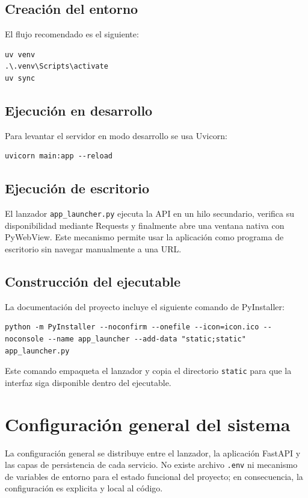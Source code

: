 \documentclass[12pt,onecolumn]{IEEEtran}
\begin{document}
\subsection{Creación del entorno}
El flujo recomendado es el siguiente:

\begin{lstlisting}[style=cs2bash,caption={Creación y activación del entorno con UV},label={lst:uv-setup}]
uv venv
.\.venv\Scripts\activate
uv sync
\end{lstlisting}

\subsection{Ejecución en desarrollo}
Para levantar el servidor en modo desarrollo se usa Uvicorn:

\begin{lstlisting}[style=cs2bash,caption={Ejecución del servidor de desarrollo},label={lst:run-dev}]
uvicorn main:app --reload
\end{lstlisting}

\subsection{Ejecución de escritorio}
El lanzador \texttt{app\_launcher.py} ejecuta la API en un hilo secundario, verifica su disponibilidad mediante Requests y finalmente abre una ventana nativa con PyWebView. Este mecanismo permite usar la aplicación como programa de escritorio sin navegar manualmente a una URL.

\subsection{Construcción del ejecutable}
La documentación del proyecto incluye el siguiente comando de PyInstaller:

\begin{lstlisting}[style=cs2bash,caption={Construcción del ejecutable con PyInstaller},label={lst:pyinstaller}]
python -m PyInstaller --noconfirm --onefile --icon=icon.ico --noconsole --name app_launcher --add-data "static;static" app_launcher.py
\end{lstlisting}

Este comando empaqueta el lanzador y copia el directorio \texttt{static} para que la interfaz siga disponible dentro del ejecutable.

\section{Configuración general del sistema}
La configuración general se distribuye entre el lanzador, la aplicación FastAPI y las capas de persistencia de cada servicio. No existe archivo \texttt{.env} ni mecanismo de variables de entorno para el estado funcional del proyecto; en consecuencia, la configuración es explicita y local al código.
\end{document}
